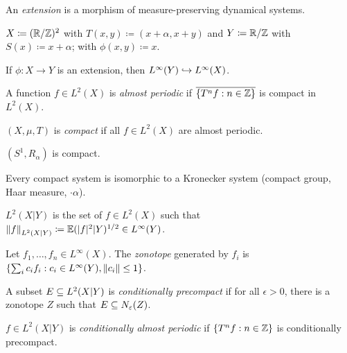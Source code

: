 \documentclass[reqno, twoside]{article}
\begin{document}
    \begin{definition}
        An \textit{extension} is a morphism of measure-preserving dynamical systems.
    \end{definition}

    \begin{example}
        $X\coloneqq(\mathbb{R}/\mathbb{Z})^2$ with $T(x,y)\coloneqq(x+\alpha,x+y)$ and $Y\coloneqq\mathbb{R}/\mathbb{Z}$ with $S(x)\coloneqq x+\alpha$; with $\phi(x,y)\coloneqq x$.
    \end{example}

    If $\phi:X\to Y$ is an extension, then $L^\infty(Y)\hookrightarrow L^\infty(X)$.

    \begin{definition}
        A function $f\in L^2(X)$ is \textit{almost periodic} if $\overline{\left\{T^nf: n\in\mathbb{Z}\right\}}$ is compact in $L^2(X)$.

        $(X,\mu,T)$ is \textit{compact} if all $f\in L^2(X)$ are almost periodic.
    \end{definition}

    \begin{example}
        $(S^1,R_\alpha)$ is compact.
    \end{example}

    \begin{theorem}
        Every compact system is isomorphic to a Kronecker system (compact group, Haar measure, $\cdot\alpha$).
    \end{theorem}

    \begin{definition}
        $L^2(X|Y)$ is the set of $f\in L^2(X)$ such that $\left\|f\right\|_{L^2(X|Y)}\coloneqq\mathbb{E}(|f|^2|Y)^{1/2}\in L^\infty(Y)$.
    \end{definition}

    \begin{definition}
        Let $f_1,\dots,f_n\in L^\infty(X)$. The \textit{zonotope} generated by $f_i$ is $\left\{\sum_ic_if_i: c_i\in L^\infty(Y),\left\|c_i\right\|\leq1\right\}$.
    \end{definition}

    \begin{definition}
        A subset $E\subseteq L^2(X|Y)$ is \textit{conditionally precompact} if for all $\epsilon>0$, there is a zonotope $Z$ such that $E\subseteq N_\varepsilon(Z)$.
    \end{definition}

    \begin{definition}
        $f\in L^2(X|Y)$ is \textit{conditionally almost periodic} if $\left\{T^nf: n\in\mathbb{Z}\right\}$ is conditionally precompact.
    \end{definition}
\end{document}
